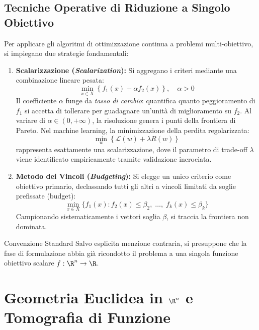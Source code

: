 \subsection{Tecniche Operative di Riduzione a Singolo Obiettivo}
Per applicare gli algoritmi di ottimizzazione continua a problemi multi-obiettivo, si impiegano due strategie fondamentali:
\begin{enumerate}
    \item \textbf{Scalarizzazione (\textit{Scalarization}):} Si aggregano i criteri mediante una combinazione lineare pesata:
    \begin{equation}
    \min_{x \in X} \left\{ f_1(x) + \alpha f_2(x) \right\}, \quad \alpha > 0
    \end{equation}
    Il coefficiente $\alpha$ funge da \textit{tasso di cambio}: quantifica quanto peggioramento di $f_1$ si accetta di tollerare per guadagnare un'unit\`a di miglioramento su $f_2$. Al variare di $\alpha \in (0, +\infty)$, la risoluzione genera i punti della frontiera di Pareto. Nel machine learning, la minimizzazione della perdita regolarizzata:
    \begin{equation}
    \min_w \left\{ \mathcal{L}(w) + \lambda R(w) \right\}
    \end{equation}
    rappresenta esattamente una scalarizzazione, dove il parametro di trade-off $\lambda$ viene identificato empiricamente tramite validazione incrociata.
    
    \item \textbf{Metodo dei Vincoli (\textit{Budgeting}):} Si elegge un unico criterio come obiettivo primario, declassando tutti gli altri a vincoli limitati da soglie prefissate (budget):
    \begin{equation}
    \min_{x \in X} \{ f_1(x) : f_2(x) \le \beta_2, \; \dots, \; f_k(x) \le \beta_k \}
    \end{equation}
    Campionando sistematicamente i vettori soglia $\beta$, si traccia la frontiera non dominata.
\end{enumerate}

\begin{noteblock}{Convenzione Standard}
Salvo esplicita menzione contraria, si presuppone che la fase di formulazione abbia gi\`a ricondotto il problema a una singola funzione obiettivo scalare $f: \R^n \to \R$.
\end{noteblock}


\FloatBarrier
\section{Geometria Euclidea in \texorpdfstring{$\R^n$}{R\textasciicircum n} e Tomografia di Funzione}
\label{sec:opt-geometria-euclidea-tomografia}

